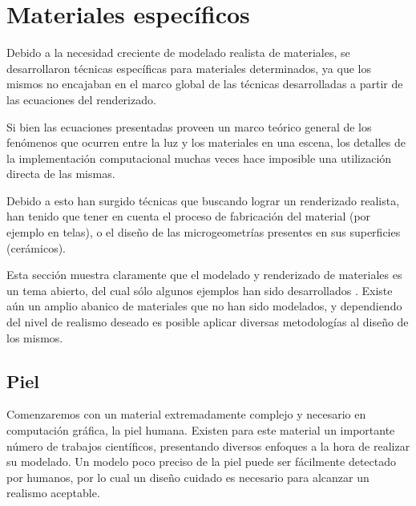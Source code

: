 
\section{Materiales específicos}
Debido a la necesidad creciente de modelado realista de materiales, se desarrollaron técnicas específicas para materiales determinados, ya que los mismos no encajaban en el marco global de las técnicas desarrolladas a partir de las ecuaciones del renderizado.

Si bien las ecuaciones presentadas proveen un marco teórico general de los fenómenos que ocurren entre la luz y los materiales en una escena, los detalles de la implementación computacional muchas veces hace imposible una utilización directa de las mismas.

Debido a esto han surgido técnicas que buscando lograr un renderizado realista, han tenido que tener en cuenta el proceso de fabricación del material (por ejemplo en telas), o el diseño de las microgeometrías presentes en sus superficies (cerámicos).


Esta sección muestra claramente que el modelado y renderizado de materiales es un tema abierto, del cual sólo algunos ejemplos han sido desarrollados \cite{Dorsey2007}.
Existe aún un amplio abanico de materiales que no han sido modelados, y dependiendo del nivel de realismo deseado es posible aplicar diversas metodologías al diseño de los mismos.


\subsection{Piel}
Comenzaremos con un material extremadamente complejo y necesario en computación gráfica, la piel humana.
Existen para este material un importante número de trabajos científicos, presentando diversos enfoques a la hora de realizar su modelado.
Un modelo poco preciso de la piel puede ser fácilmente detectado por humanos, por lo cual un diseño cuidado es necesario para alcanzar un realismo aceptable.


